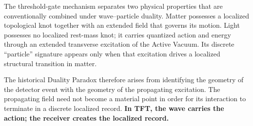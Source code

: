 \noindent The threshold-gate mechanism separates two physical properties that are conventionally combined under wave--particle duality. Matter possesses a localized topological knot together with an extended field that governs its motion. Light possesses no localized rest-mass knot; it carries quantized action and energy through an extended transverse excitation of the Active Vacuum. Its discrete ``particle'' signature appears only when that excitation drives a localized structural transition in matter.

The historical Duality Paradox therefore arises from identifying the geometry of the detector event with the geometry of the propagating excitation. The propagating field need not become a material point in order for its interaction to terminate in a discrete localized record. \textbf{In TFT, the wave carries the action; the receiver creates the localized record.}